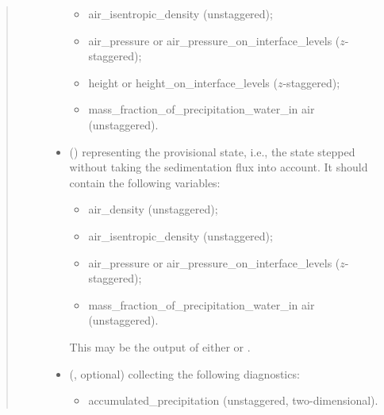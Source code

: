 \documentclass[letterpaper,10pt,english]{sphinxmanual}
\begin{document}
\begin{fulllineitems}
\begin{fulllineitems}
\begin{quote}
\begin{description}
\begin{itemize}
\begin{itemize}
\item {} 
air\_isentropic\_density (unstaggered);

\item {} 
air\_pressure or air\_pressure\_on\_interface\_levels (\(z\)-staggered);

\item {} 
height or height\_on\_interface\_levels (\(z\)-staggered);

\item {} 
mass\_fraction\_of\_precipitation\_water\_in air (unstaggered).

\end{itemize}


\item {} 
 () \textendash{} 
{\hyperref[\detokenize{api:tasmania.storages.state_isentropic.StateIsentropic}]{}} representing the provisional state, i.e.,
the state stepped without taking the sedimentation flux into account.
It should contain the following variables:
\begin{itemize}
\item {} 
air\_density (unstaggered);

\item {} 
air\_isentropic\_density (unstaggered);

\item {} 
air\_pressure or air\_pressure\_on\_interface\_levels (\(z\)-staggered);

\item {} 
mass\_fraction\_of\_precipitation\_water\_in air (unstaggered).

\end{itemize}

This may be the output of either
{\hyperref[\detokenize{api:tasmania.dycore.prognostic_isentropic.PrognosticIsentropic.step_neglecting_vertical_advection}]{}} or
{\hyperref[\detokenize{api:tasmania.dycore.prognostic_isentropic.PrognosticIsentropic.step_coupling_physics_with_dynamics}]{}}.


\item {} 
 (, optional) \textendash{} 
{\hyperref[\detokenize{api:tasmania.storages.grid_data.GridData}]{}} collecting the following diagnostics:
\begin{itemize}
\item {} 
accumulated\_precipitation (unstaggered, two-dimensional).


\end{itemize}
\end{itemize}
\end{description}
\end{quote}
\end{fulllineitems}
\end{fulllineitems}
\end{document}
